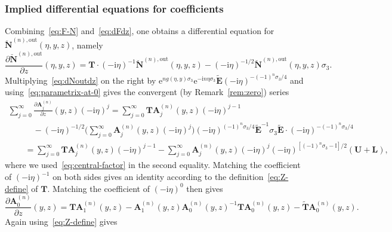 \subsubsection{Implied differential equations for coefficients}
Combining~\eqref{eq:F-N} and~\eqref{eq:dFdz}, one obtains
 a differential equation for $\breve{\mathbf{N}}^{(n),\mathrm{out}}(\eta,y,z)$, namely
 \begin{equation}
 \frac{\partial\breve{\mathbf{N}}^{(n),\mathrm{out}}}{\partial z}(\eta,y,z)=\mathbf{T}\cdot (-\mathrm{i}\eta)^{-1}\breve{\mathbf{N}}^{(n),\mathrm{out}}(\eta,y,z) - (-\mathrm{i}\eta)^{-1/2}\breve{\mathbf{N}}^{(n),\mathrm{out}}(\eta,y,z)\sigma_3.
\label{eq:dNoutdz}
\end{equation}
Multiplying~\eqref{eq:dNoutdz} on the right by $\mathrm{e}^{ng(\eta,y)\sigma_3}\mathrm{e}^{-\mathrm{i} n\eta\sigma_3}\widetilde{\mathbf{E}}(-\mathrm{i}\eta)^{-(-1)^n\sigma_3/4}$ and using~\eqref{eq:parametrix-at-0} gives the convergent (by Remark~\ref{rem:zero}) series
\begin{gather*}
\sum_{j=0}^\infty \frac{\partial\mathbf{A}^{(n)}_j}{\partial z} (y,z)(-\mathrm{i}\eta)^j
 = \sum_{j=0}^\infty \mathbf{T}\mathbf{A}^{(n)}_j(y,z)(-\mathrm{i}\eta)^{j-1} \\
\qquad\quad{} - (-\mathrm{i}\eta)^{-1/2}\Bigg(\sum_{j=0}^{\infty}\mathbf{A}_j^{(n)}(y,z) (-\mathrm{i}\eta)^j\Bigg)(-\mathrm{i}\eta)^{(-1)^n\sigma_3/4}\widetilde{\mathbf{E}}^{-1}\sigma_3\widetilde{\mathbf{E}}\cdot(-\mathrm{i}\eta)^{-(-1)^n\sigma_3/4}\\
\qquad {} = \sum_{j=0}^\infty \mathbf{T}\mathbf{A}_j^{(n)}(y,z)(-\mathrm{i}\eta)^{j-1}-\sum_{j=0}^\infty\mathbf{A}_j^{(n)}(y,z)(-\mathrm{i}\eta)^j(-\mathrm{i}\eta)^{[(-1)^n\sigma_3-\mathbb{I}]/2}(\mathbf{U}+\mathbf{L}),
\end{gather*}
where we used~\eqref{eq:central-factor} in the second equality. Matching the coefficient of $(-\mathrm{i}\eta)^{-1}$ on both sides gives an identity according to the definition~\eqref{eq:Z-define} of $\mathbf{T}$. Matching the coefficient of $(-\mathrm{i}\eta)^0$ then gives
\begin{equation*}
\frac{\partial\mathbf{A}_0^{(n)}}{\partial z}(y,z)=\mathbf{T}\mathbf{A}_1^{(n)}(y,z)-\mathbf{A}_1^{(n)}(y,z)\mathbf{A}_0^{(n)}(y,z)^{-1}\mathbf{T}\mathbf{A}_0^{(n)}(y,z) - \widetilde{\mathbf{T}}\mathbf{A}_0^{(n)}(y,z).
\end{equation*}
Again using~\eqref{eq:Z-define} gives
